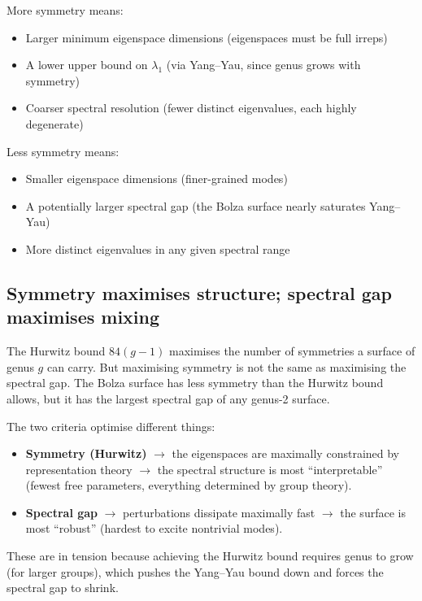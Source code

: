\documentclass[11pt,a4paper]{article}
\begin{document}
\medskip
More symmetry means:
\begin{itemize}[leftmargin=*]
  \item Larger minimum eigenspace dimensions (eigenspaces must be full irreps)
  \item A lower upper bound on $\lambda_1$ (via Yang--Yau, since genus grows with symmetry)
  \item Coarser spectral resolution (fewer distinct eigenvalues, each highly degenerate)
\end{itemize}

Less symmetry means:
\begin{itemize}[leftmargin=*]
  \item Smaller eigenspace dimensions (finer-grained modes)
  \item A potentially larger spectral gap (the Bolza surface nearly saturates Yang--Yau)
  \item More distinct eigenvalues in any given spectral range
\end{itemize}

\subsection{Symmetry maximises structure; spectral gap maximises mixing}

The Hurwitz bound $84(g-1)$ maximises the number of symmetries a surface of
genus $g$ can carry. But maximising symmetry is not the same as maximising the
spectral gap. The Bolza surface has less symmetry than the Hurwitz bound
allows, but it has the largest spectral gap of any genus-2 surface.

The two criteria optimise different things:
\begin{itemize}[leftmargin=*]
  \item \textbf{Symmetry (Hurwitz)} $\to$ the eigenspaces are maximally
    constrained by representation theory $\to$ the spectral structure is most
    ``interpretable'' (fewest free parameters, everything determined by group theory).
  \item \textbf{Spectral gap} $\to$ perturbations dissipate maximally fast
    $\to$ the surface is most ``robust'' (hardest to excite nontrivial modes).
\end{itemize}

These are in tension because achieving the Hurwitz bound requires genus to grow
(for larger groups), which pushes the Yang--Yau bound down and forces the
spectral gap to shrink.
\end{document}
